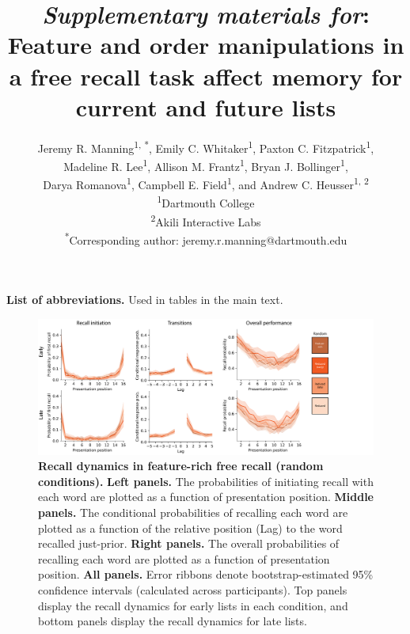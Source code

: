 \documentclass{article}
\title{\textit{Supplementary materials for}: Feature and order manipulations in
a free recall task affect memory for current and future lists}
\author{Jeremy R. Manning\textsuperscript{1, *}, Emily C.
Whitaker\textsuperscript{1}, Paxton C. Fitzpatrick\textsuperscript{1},
\\Madeline R. Lee\textsuperscript{1}, Allison M. Frantz\textsuperscript{1},
Bryan J. Bollinger\textsuperscript{1},\\Darya Romanova\textsuperscript{1},
Campbell E. Field\textsuperscript{1}, and Andrew C. Heusser\textsuperscript{1,
2}\\\textsuperscript{1}Dartmouth College\\\textsuperscript{2}Akili
Interactive Labs\\\textsuperscript{*}Corresponding author:
jeremy.r.manning@dartmouth.edu}
\date{}
\begin{document}


\setcounter{equation}{0}
\setcounter{figure}{0}
\setcounter{table}{0}
\setcounter{page}{1} 
\setcounter{section}{0}
\makeatletter
\renewcommand{\theequation}{S\arabic{equation}}
\renewcommand{\thefigure}{S\arabic{figure}}
\renewcommand{\thetable}{S\arabic{table}}
\renewcommand{\bibnumfmt}[1]{[S#1]}
\renewcommand{\citenumfont}[1]{S#1}

\maketitle
\thispagestyle{empty}

\begin{table}[p]
    \centering
    
    
    \caption{\textbf{List of abbreviations.} Used in tables in the main text.}
    
    \label{tab:abbreviations}
\end{table}

\begin{figure}[p] \centering
\includegraphics[width=\textwidth]{figures/recall_dynamics_random}

\caption{\textbf{Recall dynamics in feature-rich free recall (random
conditions).} \textbf{Left panels.} The probabilities of initiating recall with
each word are plotted as a function of presentation position. \textbf{Middle
panels.} The conditional probabilities of recalling each word are plotted as a
function of the relative position (Lag) to the word recalled just-prior.
\textbf{Right panels.} The overall probabilities of recalling each word are
plotted as a function of presentation position. \textbf{All panels.} Error
ribbons denote bootstrap-estimated 95\% confidence intervals (calculated across
participants). Top panels display the recall dynamics for early lists in each
condition, and bottom panels display the recall dynamics for late lists.}

    \label{fig:recall-dynamics-random}
\end{figure}
\end{document}
